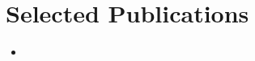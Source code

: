 \documentclass[12pt]{article}   %
\begin{document}
\section*{Selected Publications}
\begin{itemize}
\item 
\end{itemize}
   \nocite{*}                   %

\end{document}

